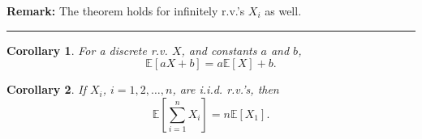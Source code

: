 \documentclass[12pt]{amsart}
\newtheorem{corollary}{Corollary}[theorem]
\newtheorem{example}[theorem]{Example}
\begin{document}
{%
\vspace{.5cm}


\textbf{Remark:} %
The theorem holds for infinitely r.v.'s $X_i$ as well.


 

\vspace{.5cm}
\hrule
\vspace{.5cm}



%


\vspace{.5cm}

\begin{corollary}\label{LinearComboE}
For a discrete r.v. $X$, and constants $a$ and $b$, 
$$
\mathbb{E}[aX+b] = a\mathbb{E}[X] + b.
$$ 
\end{corollary}

\vspace{.5cm}


\begin{corollary}
If $X_i$, $i=1,2,\dots, n$, are i.i.d. r.v.'s, then
$$
\mathbb{E}[\sum_{i=1}^n X_i] = n\mathbb{E}[X_1] .
$$ 
\end{corollary}

\vspace{.5cm}

}
\end{document}
